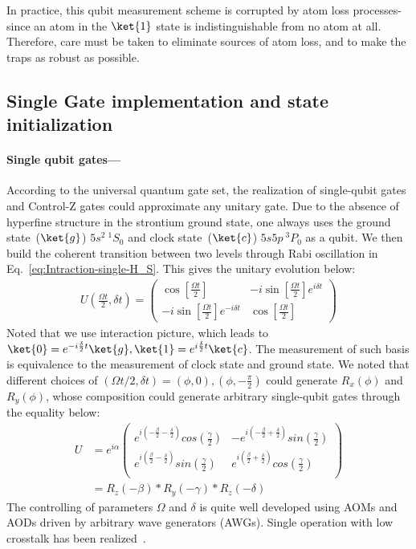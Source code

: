 \documentclass[11pt]{article}
\begin{document}
In practice, this qubit measurement scheme is corrupted by atom loss processes-since an atom in the $\ket{1}$ state is indistinguishable from no atom at all. Therefore, care must be taken to eliminate sources of atom loss, and to make the traps as robust as possible.

\subsection{Single Gate implementation and state initialization}

\paragraph*{Single qubit gates---\!\!\!}
According to the universal quantum gate set, the realization of single-qubit gates and Control-Z gates could approximate any unitary gate. Due to the absence of hyperfine structure in the strontium ground state, one always uses the ground state~($\ket{g}$) $5s^2 ~{^1}S_0$ and clock state~($\ket{c}$) $5s5p~ {^3}P_0$ as a qubit.  We then build the coherent transition between two levels through Rabi oscillation in Eq.~\eqref{eq:Intraction-single-H_S}. This gives the unitary evolution below:
\begin{align}
    U(\frac{\Omega t}{2}, \delta t) = \begin{pmatrix}
        \cos[\frac{\Omega t}{2}] & -i \sin[\frac{\Omega t}{2}]e^{i \delta t} \\
        -i \sin[\frac{\Omega t}{2}] e^{- i \delta t} & \cos[\frac{\Omega t}{2}]
    \end{pmatrix}
\end{align}
Noted that we use interaction picture, which leads to $\ket{0} = e^{-i \frac{\delta}{2} t} \ket{g},\ket{1} = e^{i\frac{\delta}{2} t} \ket{c} $. The measurement of such basis is equivalence to the measurement of clock state and ground state. We noted that different choices of $(\Omega t/2, \delta t) = (\phi,0),(\phi,-\frac{\pi}{2})$ could generate $R_x(\phi)$ and $R_y(\phi)$, whose composition could generate arbitrary single-qubit gates through the equality below: 
\begin{align*}
    U&=e^{i\alpha}\begin{pmatrix}
    e^{i(-\frac{\beta}{2}-\frac{\delta}{2})}cos(\frac{\gamma}{2})&-e^{i(-\frac{\beta}{2}+\frac{\delta}{2})}sin(\frac{\gamma}{2})\\
    e^{i(\frac{\beta}{2}-\frac{\delta}{2})}sin(\frac{\gamma}{2})&e^{i(\frac{\beta}{2}+\frac{\delta}{2})}cos(\frac{\gamma}{2})\\
\end{pmatrix} \\
&=R_z(-\beta)*R_y(-\gamma)*R_z(-\delta)
\end{align*}
The controlling of parameters $\Omega$ and $\delta$ is quite well developed using AOMs and AODs driven by arbitrary wave generators (AWGs). Single operation with low crosstalk has been realized~\cite{PhysRevLett.119.053202}. 
\end{document}
